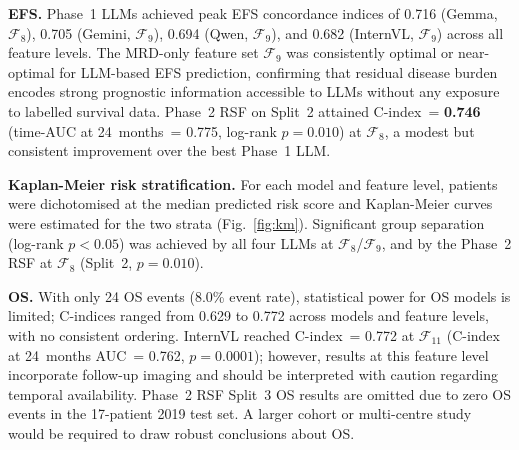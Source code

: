 \documentclass[pdflatex,sn-nature]{sn-jnl}
\begin{document}
\textbf{EFS.}
Phase~1 LLMs achieved peak EFS concordance indices of 0.716 (Gemma,
$\mathcal{F}_8$), 0.705 (Gemini, $\mathcal{F}_9$), 0.694
(Qwen, $\mathcal{F}_9$), and 0.682 (InternVL, $\mathcal{F}_9$)
across all feature levels.
The MRD-only feature set $\mathcal{F}_9$ was consistently optimal or
near-optimal for LLM-based EFS prediction, confirming that residual
disease burden encodes strong prognostic information accessible to
LLMs without any exposure to labelled survival data.
Phase~2 RSF on Split~2 attained C-index~= \textbf{0.746}
(time-AUC at 24~months~= 0.775, log-rank $p = 0.010$) at
$\mathcal{F}_8$, a modest but consistent improvement over the
best Phase~1 LLM.

\textbf{Kaplan-Meier risk stratification.}
For each model and feature level, patients were dichotomised at the
median predicted risk score and Kaplan-Meier curves were estimated for
the two strata (Fig.~\ref{fig:km}).
Significant group separation (log-rank $p < 0.05$) was achieved by
all four LLMs at $\mathcal{F}_8$/$\mathcal{F}_9$, and by the
Phase~2 RSF at $\mathcal{F}_8$ (Split~2, $p = 0.010$).

\textbf{OS.}
With only 24 OS events (8.0\% event rate), statistical power for OS
models is limited; C-indices ranged from 0.629 to 0.772 across
models and feature levels, with no consistent ordering.
InternVL reached C-index~= 0.772 at $\mathcal{F}_{11}$ (C-index at
24~months AUC~= 0.762, $p = 0.0001$); however, results at this
feature level incorporate follow-up imaging and should be interpreted
with caution regarding temporal availability.
Phase~2 RSF Split~3 OS results are omitted due to zero OS events in
the 17-patient 2019 test set.
A larger cohort or multi-centre study would be required to draw
robust conclusions about OS.
\end{document}

